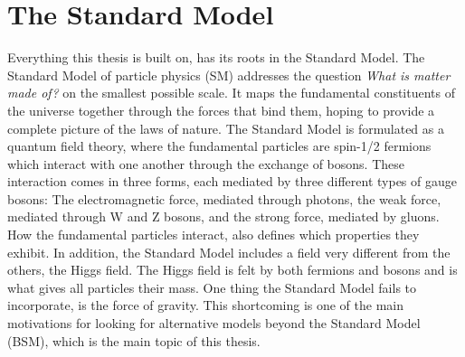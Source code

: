 \section{The Standard Model}
Everything this thesis is built on, has its roots in the Standard Model. The Standard Model of particle physics (SM) addresses the question \emph{What is matter made of?} on the smallest possible scale. It maps the fundamental constituents of the universe together through the forces that bind them, hoping to provide a complete picture of the laws of nature. The Standard Model is formulated as a quantum field theory, where the fundamental particles are spin-1/2 fermions which interact with one another through the exchange of bosons. These interaction comes in three forms, each mediated by three different types of gauge bosons: The electromagnetic force, mediated through photons, the weak force, mediated through W and Z bosons, and the strong force, mediated by gluons. How the fundamental particles interact, also defines which properties they exhibit. In addition, the Standard Model includes a field very different from the others, the Higgs field. The Higgs field is felt by both fermions and bosons and is what gives all particles their mass.\newline
One thing the Standard Model fails to incorporate, is the force of gravity. This shortcoming is one of the main motivations for looking for alternative models beyond the Standard Model (BSM), which is the main topic of this thesis.

